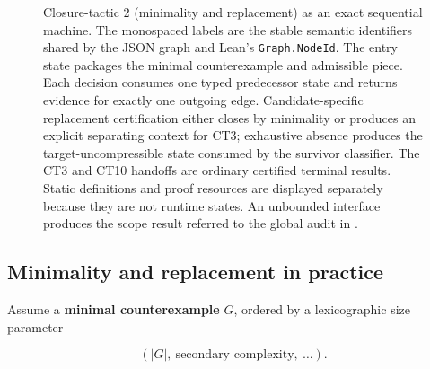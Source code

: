 \begin{figure}[p]
{%
}
\caption[Closure-tactic 2: minimality and replacement]{Closure-tactic 2 (minimality and replacement) as an exact sequential machine.  The monospaced labels are the stable semantic identifiers shared by the JSON graph and Lean's \texttt{Graph.NodeId}.  The entry state packages the minimal counterexample and admissible piece.  Each decision consumes one typed predecessor state and returns evidence for exactly one outgoing edge.  Candidate-specific replacement certification either closes by minimality or produces an explicit separating context for CT3; exhaustive absence produces the target-uncompressible state consumed by the survivor classifier.  The CT3 and CT10 handoffs are ordinary certified terminal results.  Static definitions and proof resources are displayed separately because they are not runtime states.  An unbounded interface produces the scope result referred to the global audit in .}
\label{fig:ct2-minimality-replacement}
\end{figure}
\FloatBarrier

\subsection*{Minimality and replacement in practice}

Assume a \textbf{minimal counterexample} \(G\), ordered by a
lexicographic size parameter

\[
(|G|,\ \text{secondary complexity},\ \ldots).
\]

